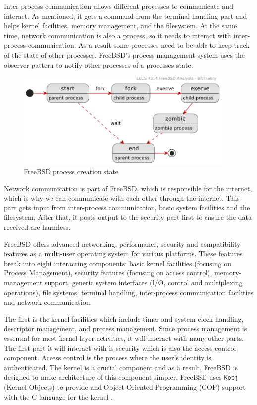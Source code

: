 \documentclass[12pt, dvipsnames, a4paper]{article}
\newcommand{\code}[1]{\texttt{#1}}
\begin{document}
Inter-process communication allows different processes to communicate and interact. As mentioned, it gets a command from the terminal handling part and helps kernel facilities, memory management, and the filesystem. At the same time, network communication is also a process, so it needs to interact with inter-process communication. As a result some processes need to be able to keep track of the state of other processes. FreeBSD's process management system uses the observer pattern to notify other processes of a processes state.
\begin{figure}[!htb]
	\centering
	\includegraphics[width = 300pt]{assets/state_diagrams/process-state.pdf}
	\caption{FreeBSD process creation state \cite{design}}
\end{figure}

Network communication is part of FreeBSD, which is responsible for the internet, which is why we can communicate with each other through the internet. This part gets input from inter-process communication, basic system facilities and the filesystem. After that, it posts output to the security part first to ensure the data received are harmless.

FreeBSD offers advanced networking, performance, security and compatibility features as a multi-user operating system for various platforms. These features break into eight interacting components: basic kernel facilities (focusing on Process Management), security features
(focusing on access control), memory-management support, generic system interfaces (I/O, control and multiplexing operations), file systems, terminal handling, inter-process communication facilities and network communication.

The first is the kernel facilities which include timer and system-clock handling, descriptor management, and process management. Since process management is essential for most kernel layer activities, it will interact with many other parts. The first part it will interact with
is security which is also the access control component. Access control is the process where the user's identity is authenticated. The kernel is a crucial component and as a result, FreeBSD is designed to make architecture of this component simpler. FreeBSD uses \code{Kobj} (Kernel Objects) to provide and Object Oriented Programming (OOP) support with the C language for the kernel \cite{kobj}.
\end{document}

